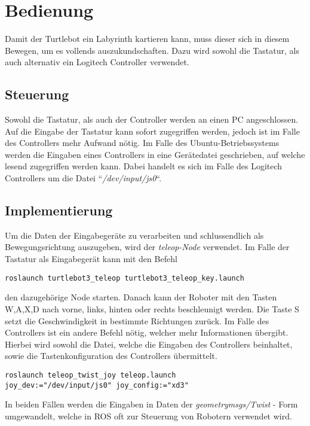 \section{Bedienung}
{
	Damit der Turtlebot ein Labyrinth kartieren kann, muss dieser sich in diesem Bewegen, um es vollends auszukundschaften. Dazu wird sowohl die Tastatur, als auch alternativ ein Logitech Controller verwendet.
	
	\subsection{Steuerung}
	{
		Sowohl die Tastatur, als auch der Controller werden an einen PC angeschlossen. Auf die Eingabe der Tastatur kann sofort zugegriffen werden, jedoch ist im Falle des Controllers mehr Aufwand nötig. Im Falle des Ubuntu-Betriebssystems werden die Eingaben eines Controllers in eine Gerätedatei geschrieben, auf welche lesend zugegriffen werden kann. Dabei handelt es sich im Falle des Logitech Controllers um die Datei ``\emph{/dev/input/js0}``.
	}

	\subsection{Implementierung}
	{ 
		Um die Daten der Eingabegeräte zu verarbeiten und schlussendlich als Bewegungsrichtung auszugeben, wird der \emph{teleop-Node} verwendet. Im Falle der Tastatur als Eingabegerät kann mit den Befehl 
		\begin{lstlisting}
roslaunch turtlebot3_teleop turtlebot3_teleop_key.launch
		\end{lstlisting}
	den dazugehörige Node starten. Danach kann der Roboter mit den Tasten W,A,X,D nach vorne, links,  hinten oder rechts beschleunigt werden. Die Taste S setzt die Geschwindigkeit in bestimmte Richtungen zurück.
	\newline
	Im Falle des Controllers ist ein andere Befehl nötig, welcher mehr Informationen übergibt. Hierbei wird sowohl die Datei, welche die Eingaben des Controllers beinhaltet, sowie die Tastenkonfiguration des Controllers übermittelt.
	\begin{lstlisting}
roslaunch teleop_twist_joy teleop.launch 
joy_dev:="/dev/input/js0" joy_config:="xd3"
	\end{lstlisting}
	
	In beiden Fällen werden die Eingaben in Daten der \emph{geometry\textunderscore msgs/Twist} - Form umgewandelt, welche in ROS oft zur Steuerung von Robotern verwendet wird.
	}
}